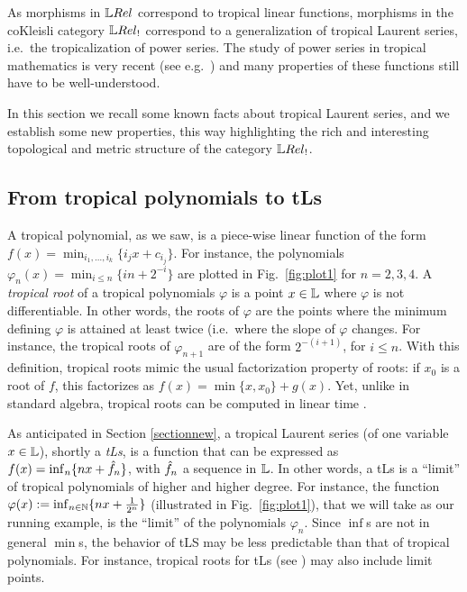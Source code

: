 
As morphisms in $\LREL$ correspond to tropical linear functions, morphisms in the coKleisli category $\LREL_{!}$ 
correspond to a generalization of tropical Laurent series, i.e.~the tropicalization of power series. 
The study of power series in tropical mathematics is very recent (see e.g.~\cite{Porzio2021}) and many properties of these functions still have to be well-understood. 

In this section we recall some known facts about tropical Laurent series, and we establish some new properties, this way highlighting the rich and interesting topological and metric structure of the category $\LREL_{!}$.

%

\subsection{From tropical polynomials to tLs}

A tropical polynomial, as we saw, is a piece-wise linear function of the form $f(x)=\min_{i_{1},\dots, i_{k}}\{i_{j}x+c_{i_{j}}\}$. For instance, the polynomials $\varphi_{n}(x)=\min_{i\leq n}\{in+2^{-i}\}$
are plotted in Fig.~\ref{fig:plot1} for $n=2,3,4$.
A \emph{tropical root} of a tropical polynomials $\varphi$ is a point $x\in \mathbb{L}$ where $\varphi$ is not differentiable. In other words, the roots of $\varphi$ are the points where the minimum defining $\varphi$ is attained at least twice (i.e.~where the slope of $\varphi$ changes. For instance, the tropical roots of $\varphi_{n+1}$ are of the form $2^{-(i+1)}$, for $i \leq n$.
With this definition, tropical roots mimic the usual factorization property of roots: if $x_{0}$ is a root of $f$, this factorizes as
$f(x)=\min\{x,x_{0}\}+ g(x)$. Yet, unlike in standard algebra, tropical roots can be computed in linear time \cite{Noferini2015}.
%



As anticipated in Section \ref{sectionnew}, a tropical Laurent series (of one variable $x\in\mathbb{L}$), shortly a \emph{tLs}, is a function that can be expressed as $f(x)=\inf_{n}\{nx+\hat{f}_{n}\}$, with $\hat{f}_{n}$ a sequence in $\mathbb{L}$. In other words, a tLs is a ``limit'' of tropical polynomials of higher and higher degree. For instance, the function $\varphi(x):=\inf_{n\in\mathbb{N}}\{nx+\frac{1}{2^n}\}$ (illustrated in Fig.~\ref{fig:plot1}), that we will take as our running example, 
is the ``limit'' of the polynomials $\varphi_{n}$. Since $\inf$s are not in general $\min$s, the behavior of tLS may be less predictable than that of tropical polynomials. For instance, tropical roots for tLs (see \cite{Porzio2021}) may also include limit points.


